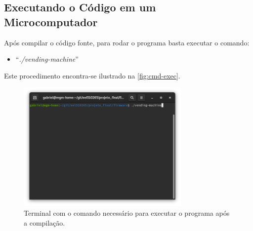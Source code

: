 \subsection{Executando o Código em um Microcomputador}

Após compilar o código fonte, para rodar o programa basta executar o comando:

\begin{itemize}
    \item ``\textit{./vending-machine}''
\end{itemize}

Este procedimento encontra-se ilustrado na \autoref{fig:cmd-exec}.

\begin{figure}[!ht]
    \begin{center}
        \includegraphics[width=0.75\textwidth]{figures/window-cmd-exec.png}
        \caption{Terminal com o comando necessário para executar o programa após a compilação.}
        \label{fig:cmd-exec}
    \end{center}
\end{figure}
